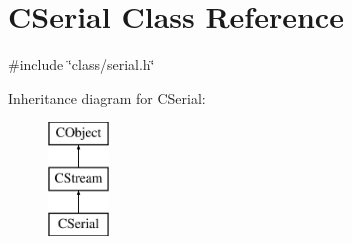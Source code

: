 \hypertarget{class_c_serial}{\section{C\-Serial Class Reference}
\label{class_c_serial}
}


{\ttfamily \#include \char`\"{}class/serial.\-h\char`\"{}}

Inheritance diagram for C\-Serial\-:\begin{figure}[H]
\begin{center}
\leavevmode
\includegraphics[height=3.000000cm]{d8/d1d/class_c_serial}
\end{center}
\end{figure}
